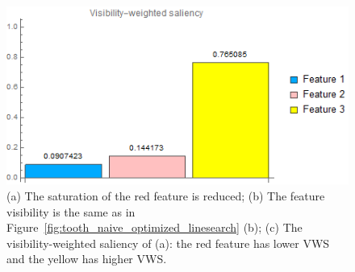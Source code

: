 \begin{figure}
\begin{minipage}{.24\textwidth}
		\subcaption{}
	\end{minipage}~
	\begin{minipage}{.24\textwidth}
		\includegraphics[width=1\linewidth]{images/tooth_naive_optimized_linesearch_red_low_saturation_visibility_saliency_weighted_chart}
		\subcaption{}
	\end{minipage}
	\caption{(a) The saturation of the red feature is reduced; (b) The feature visibility is the same as in Figure~\ref{fig:tooth_naive_optimized_linesearch} (b); (c) The visibility-weighted saliency of (a): the red feature has lower VWS and the yellow has higher VWS.}
	\label{fig:tooth_naive_optimized_linesearch_low_saturation}
\end{figure}
%

